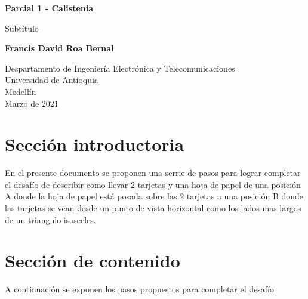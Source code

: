 \documentclass{article}
\begin{document}
\begin{titlepage}
    \begin{center}
        \vspace*{1cm}
            
        \Huge
        \textbf{Parcial 1 - Calistenia}
            
        \vspace{0.5cm}
        \LARGE
        Subtítulo
            
        \vspace{1.5cm}
            
        \textbf{Francis David Roa Bernal}
            
        \vfill
            
        \vspace{0.8cm}
            
        \Large
        Despartamento de Ingeniería Electrónica y Telecomunicaciones\\
        Universidad de Antioquia\\
        Medellín\\
        Marzo de 2021
            
    \end{center}
\end{titlepage}

\tableofcontents
\newpage
\section{Sección introductoria}\label{intro}
 En el presente documento se proponen una serrie de pasos para lograr completar el desafío de describir como llevar 2 tarjetas y una hoja de papel de una posición A donde la hoja de papel está posada sobre las 2 tarjetas a una posición B donde las tarjetas se vean desde un punto de vista horizontal como los lados mas largos de un triangulo isosceles.

\section{Sección de contenido} \label{contenido}
A continuación se exponen los pasos propuestos para completar el desafío
\end{document}
